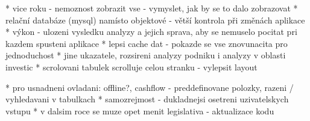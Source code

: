 * vice roku - nemoznost zobrazit vse - vymyslet, jak by se to dalo zobrazovat
* relační databáze (mysql) namísto objektové - větší kontrola při změnách aplikace
* výkon - ulozeni vysledku analyzy a jejich sprava, aby se nemuselo pocitat pri kazdem spusteni aplikace
* lepsi cache dat - pokazde se vse znovunacita pro jednoduchost
* jine ukazatele, rozsireni analyzy podniku i analyzy v oblasti investic
* scrolovani tabulek scrolluje celou stranku - vylepsit layout

* pro usnadneni ovladani: offline?, cashflow - preddefinovane polozky, razeni / vyhledavani v tabulkach
* samozrejmost - dukladnejsi osetreni uzivatelskych vstupu
* v dalsim roce se muze opet menit legislativa - aktualizace kodu

